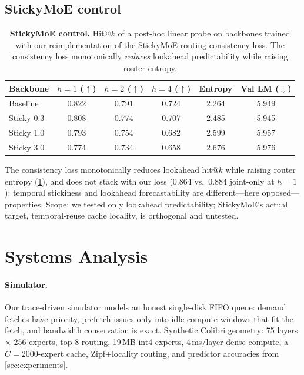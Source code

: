 \documentclass[10pt,letterpaper]{article}
\begin{document}
\subsection{StickyMoE control}
\label{sec:sticky}

\begin{table}[t]
  \centering
  \caption{\textbf{StickyMoE control.} Hit@$k$ of a post-hoc linear probe on backbones trained with our reimplementation of the StickyMoE routing-consistency loss. The consistency loss monotonically \emph{reduces} lookahead predictability while raising router entropy.}
  \label{tab:sticky}
  \begin{tabular}{lccccc}
    \toprule
    Backbone & $h{=}1$ ($\uparrow$) & $h{=}2$ ($\uparrow$) & $h{=}4$ ($\uparrow$) & Entropy & Val LM ($\downarrow$) \\
    \midrule
    Baseline & 0.822 & 0.791 & 0.724 & 2.264 & 5.949 \\
    Sticky 0.3 & 0.808 & 0.774 & 0.707 & 2.485 & 5.945 \\
    Sticky 1.0 & 0.793 & 0.754 & 0.682 & 2.599 & 5.957 \\
    Sticky 3.0 & 0.774 & 0.734 & 0.658 & 2.676 & 5.976 \\
    \bottomrule
  \end{tabular}
\end{table}

The consistency loss monotonically reduces lookahead hit@$k$ while raising router entropy (\cref{tab:sticky}), and does not stack with our loss (0.864 vs.\ 0.884 joint-only at $h{=}1$): temporal stickiness and lookahead forecastability are different---here opposed---properties. Scope: we tested only lookahead predictability; StickyMoE's actual target, temporal-reuse cache locality, is orthogonal and untested.

\section{Systems Analysis}
\label{sec:systems}

\paragraph{Simulator.} Our trace-driven simulator models an honest single-disk FIFO queue: demand fetches have priority, prefetch issues only into idle compute windows that fit the fetch, and bandwidth conservation is exact. Synthetic Colibri geometry: 75 layers $\times$ 256 experts, top-8 routing, 19\,MB int4 experts, 4\,ms/layer dense compute, a $C{=}2000$-expert cache, Zipf+locality routing, and predictor accuracies from \cref{sec:experiments}.
\end{document}
